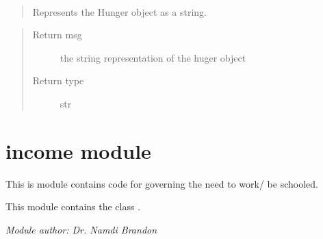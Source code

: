 \documentclass[letterpaper,10pt,english]{sphinxmanual}
\begin{document}
\begin{fulllineitems}
\begin{fulllineitems}
\end{fulllineitems}


\begin{fulllineitems}
\label{hunger:hunger.Hunger.toString}~\begin{quote}

Represents the Hunger object as a string.
\end{quote}
\begin{quote}\begin{description}
\item[{Return msg}] \leavevmode
the string representation of the huger object

\item[{Return type}] \leavevmode
str

\end{description}\end{quote}

\end{fulllineitems}


\end{fulllineitems}



\section{income module}
\label{income::doc}\label{income:module-income}\label{income:income-module}
This is module contains code for governing the need to work/ be schooled.

This module contains the class {\hyperref[income:income.Income]{\emph{}}}.

\emph{Module author: Dr. Namdi Brandon}
\end{document}
